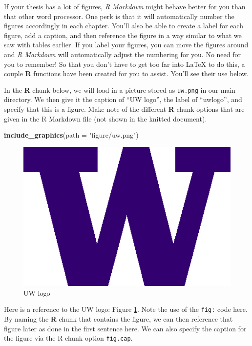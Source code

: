 \documentclass[twoside,12pt,final]{ucthesis-CA2012}
\newenvironment{Shaded}{}{}
\newcommand{\KeywordTok}[1]{\textcolor[rgb]{0.00,0.44,0.13}{\textbf{{#1}}}}
\newcommand{\DataTypeTok}[1]{\textcolor[rgb]{0.56,0.13,0.00}{{#1}}}
\newcommand{\StringTok}[1]{\textcolor[rgb]{0.25,0.44,0.63}{{#1}}}
\newcommand{\NormalTok}[1]{{#1}}
\begin{document}
\begin{ucmainmatter}
If your thesis has a lot of figures, \emph{R Markdown} might behave better for you than that other word processor. One perk is that it will automatically number the figures accordingly in each chapter. You'll also be able to create a label for each figure, add a caption, and then reference the figure in a way similar to what we saw with tables earlier. If you label your figures, you can move the figures around and \emph{R Markdown} will automatically adjust the numbering for you. No need for you to remember! So that you don't have to get too far into LaTeX to do this, a couple \textbf{R} functions have been created for you to assist. You'll see their use below.

In the \textbf{R} chunk below, we will load in a picture stored as \texttt{uw.png} in our main directory. We then give it the caption of ``UW logo'', the label of ``uwlogo'', and specify that this is a figure. Make note of the different \textbf{R} chunk options that are given in the R Markdown file (not shown in the knitted document).
\begin{Shaded}
\begin{Highlighting}[]
\KeywordTok{include_graphics}\NormalTok{(}\DataTypeTok{path =} \StringTok{"figure/uw.png"}\NormalTok{)}
\end{Highlighting}
\end{Shaded}
\begin{figure}
\centering
\includegraphics{figure/uw.png}
\caption{\label{fig:uwlogo}UW logo}
\end{figure}
Here is a reference to the UW logo: Figure \ref{fig:uwlogo}. Note the use of the \texttt{fig:} code here. By naming the \textbf{R} chunk that contains the figure, we can then reference that figure later as done in the first sentence here. We can also specify the caption for the figure via the R chunk option \texttt{fig.cap}.


\end{ucmainmatter}
\end{document}
